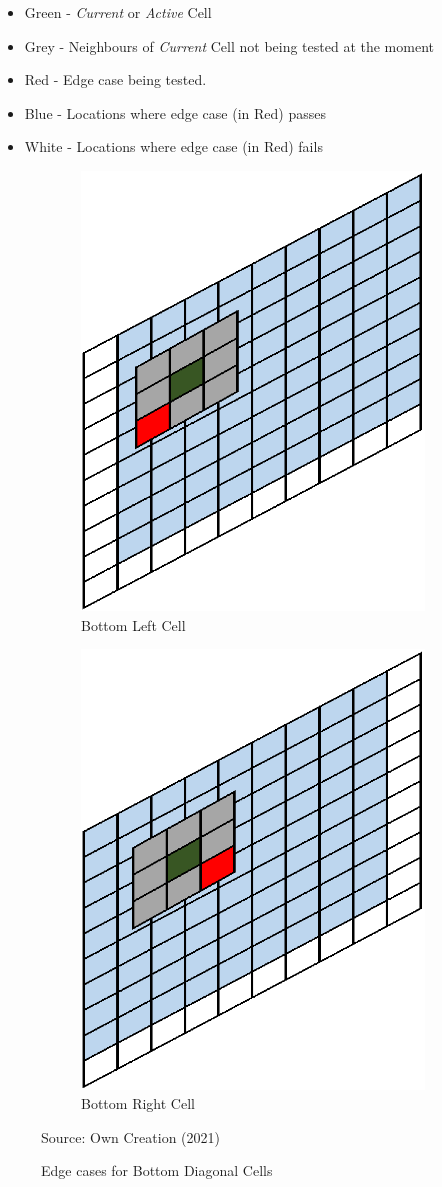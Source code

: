 \begin{itemize}
\item Green - \textit{Current} or \textit{Active} Cell
\item Grey - Neighbours of \textit{Current} Cell not being tested at the moment
\item Red - Edge case being tested.
\item Blue - Locations where edge case (in Red) passes
\item White - Locations where edge case (in Red) fails 
\end{itemize}

\begin{figure}[H]
\centering
\begin{subfigure}{.4\textwidth}
  \centering
  \includegraphics[width=.5\linewidth]{Figures/Chapter3/botleft}
  \caption{Bottom Left Cell}
\end{subfigure}%
\begin{subfigure}{.4\textwidth}
  \centering
  \includegraphics[width=.5\linewidth]{Figures/Chapter3/botright}
  \caption{Bottom Right Cell}
\end{subfigure}
\caption{Edge cases for Bottom Diagonal Cells}
\begin{center}
Source: Own Creation (2021)
\end{center}
\label{fig:e1}
\end{figure}

